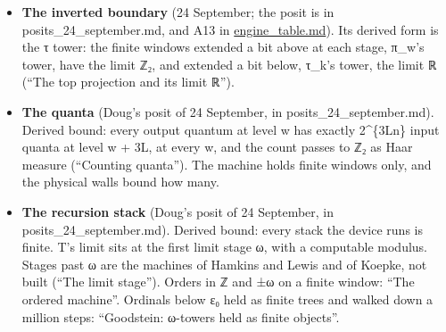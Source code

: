 \begin{itemize}
\begin{itemize}
\item An infinite expansion is not infinite complexity. 1/3 = …10101011 never ends, and a program a few bits long prints any window of it: K(π\_\allowbreak{}w(1/3)) ≤ K(w) + c = O(log w).
\item For a computable x ∈ ℤ₂, K(π\_\allowbreak{}w(x)) ≤ K(x) + O(log w): run x's program to w digits, given w.
\item Haar-almost every element of ℤ₂ is Martin-Löf random (Martin-Löf 1966). The Haar measure on ℤ₂ is the fair coin on its digits, and the random sequences have measure 1. A random element is not computable.
\item The machine reaches finite windows only. Every register is π\_\allowbreak{}w of something, and any w-bit window has K ≤ w + O(log w). Every constant in a program is a finite description, and the machine's reach is the windows of computable elements.
\item “Infinitely complex” can name only a limit object the machine never holds whole. Which object the anchors are, and whether they are random elements of ℤ₂, is open. “Bending the information field” has no definition here to derive from.
\end{itemize}
\item \textbf{The inverted boundary} (24 September; the posit is in posits\_\allowbreak{}24\_\allowbreak{}september.md, and A13 in \hyperref[chap:engine-table]{engine\_\allowbreak{}table.md}). Its derived form is the τ tower: the finite windows extended a bit above at each stage, π\_\allowbreak{}w's tower, have the limit ℤ₂, and extended a bit below, τ\_\allowbreak{}k's tower, the limit ℝ (“The top projection and its limit ℝ”).
\item \textbf{The quanta} (Doug's posit of 24 September, in posits\_\allowbreak{}24\_\allowbreak{}september.md). Derived bound: every output quantum at level w has exactly 2\textasciicircum{}\{3Ln\} input quanta at level w + 3L, at every w, and the count passes to ℤ₂ as Haar measure (“Counting quanta”). The machine holds finite windows only, and the physical walls bound how many.
\item \textbf{The recursion stack} (Doug's posit of 24 September, in posits\_\allowbreak{}24\_\allowbreak{}september.md). Derived bound: every stack the device runs is finite. T's limit sits at the first limit stage ω, with a computable modulus. Stages past ω are the machines of Hamkins and Lewis and of Koepke, not built (“The limit stage”). Orders in ℤ and ±ω on a finite window: “The ordered machine”. Ordinals below ε₀ held as finite trees and walked down a million steps: “Goodstein: ω-towers held as finite objects”.

\end{itemize}
